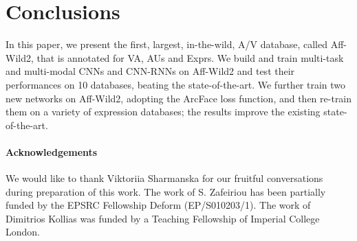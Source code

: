 \documentclass{bmvc2k}
\begin{document}
\section{Conclusions}
 \vskip-0.3cm
\noindent In this paper, we present the first, largest, in-the-wild, A/V database, called Aff-Wild2, that is annotated for VA, AUs and Exprs. We build and train multi-task and multi-modal CNNs and CNN-RNNs on Aff-Wild2 and test their performances on 10 databases, beating the state-of-the-art. We further train two new networks on Aff-Wild2, adopting the ArcFace loss function, and then re-train them on a variety of expression databases; the results improve the existing state-of-the-art.

\paragraph{Acknowledgements} We would like to thank Viktoriia Sharmanska for our fruitful conversations during preparation of this work. The work of S. Zafeiriou has been partially funded by the EPSRC Fellowship Deform (EP/S010203/1). The work of Dimitrios Kollias was funded by a Teaching Fellowship of Imperial College London. 



\end{document}
